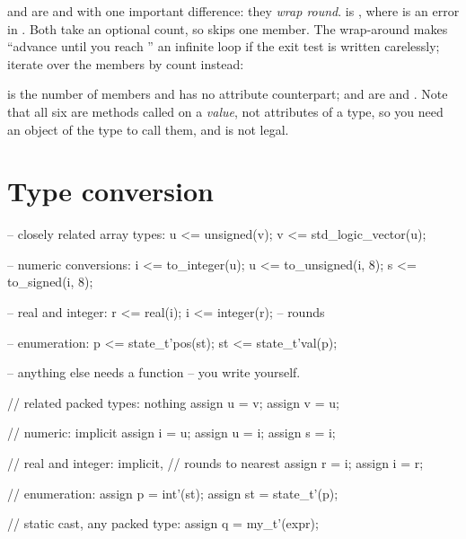  and  are  and  with one
important difference: they \emph{wrap round}.  is
, where  is an error in \VHDL{}. Both take
an optional count, so  skips one member. The wrap-around makes
``advance until you reach '' an infinite loop if the exit test is
written carelessly; iterate over the members by count instead:


 is the number of members and has no \VHDL{} attribute
counterpart;  and  are  and
. Note that all six are methods called on a \emph{value}, not
attributes of a type, so you need an object of the type to call them, and
 is not legal.

\section{Type conversion}
\label{sec:rosetta:conversion}

\begin{rosetta}
\begin{rleft}
-- closely related array types:
u  <= unsigned(v);
v  <= std_logic_vector(u);

-- numeric conversions:
i  <= to_integer(u);
u  <= to_unsigned(i, 8);
s  <= to_signed(i, 8);

-- real and integer:
r  <= real(i);
i  <= integer(r);      -- rounds

-- enumeration:
p  <= state_t'pos(st);
st <= state_t'val(p);

-- anything else needs a function
-- you write yourself.
\end{rleft}
\begin{rright}
// related packed types: nothing
assign u = v;
assign v = u;

// numeric: implicit
assign i = u;
assign u = i;
assign s = i;

// real and integer: implicit,
// rounds to nearest
assign r = i;
assign i = r;

// enumeration:
assign p  = int'(st);
assign st = state_t'(p);

// static cast, any packed type:
assign q = my_t'(expr);
\end{rright}
\end{rosetta}

